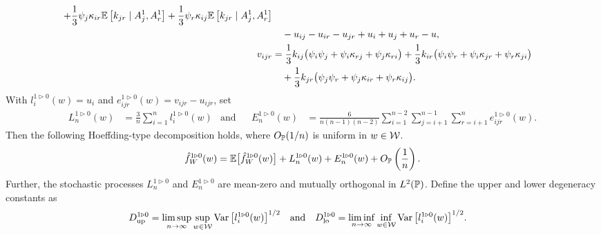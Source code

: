 \begin{lemma}
\begin{align*}
    + \frac{1}{3}
    \psi_j \kappa_{i r}
    \E\left[
      k_{jr}
    \mid A_j^1, A_r^1 \right]
    +
    \frac{1}{3}
    \psi_r \kappa_{i j}
    \E\left[
      k_{jr}
    \mid A_j^1, A_r^1 \right] \\
    &\quad-
    u_{i j} - u_{i r} - u_{jr}
    + u_i + u_j + u_r
    - u, \\
    v_{i j r}
    &=
    \frac{1}{3}
    k_{i j} \big(\psi_i \psi_j +\psi_i \kappa_{r j} +\psi_j \kappa_{r i} \big)
    + \frac{1}{3}
    k_{i r} \big(\psi_i \psi_r +\psi_i \kappa_{jr} +\psi_r \kappa_{j i} \big) \\
    &\quad+
    \frac{1}{3}
    k_{jr} \big(\psi_j \psi_r +\psi_j \kappa_{i r} +\psi_r \kappa_{i j} \big).
  \end{align*}
  With $l_i^{1 \triangleright 0}(w) = u_i$
  and $e_{i j r}^{1 \triangleright 0}(w) = v_{i j r} - u_{i j r}$,
  set
  \begin{align*}
    L_n^{1 \triangleright 0}(w)
    &=
    \frac{3}{n} \sum_{i=1}^n
    l_i^{1 \triangleright 0}(w)
    &\text{and}                 &
    &E_n^{1 \triangleright 0}(w)
    &=
    \frac{6}{n(n-1)(n-2)}
    \sum_{i=1}^{n-2}
    \sum_{j=i+1}^{n-1}
    \sum_{r=i+1}^n
    e_{i j r}^{1 \triangleright 0}(w).
  \end{align*}
  Then the following Hoeffding-type decomposition holds,
  where $O_\P(1/n)$ is uniform in $w \in \cW$.
  \begin{align*}
    \hat f_W^{1 \triangleright 0}(w)
    = \E\big[\hat f_W^{1 \triangleright 0}(w)\big]
    + L_n^{1 \triangleright 0}(w)
    + E_n^{1 \triangleright 0}(w)
    + O_\P\left( \frac{1}{n} \right).
  \end{align*}
  Further,
  the stochastic processes
  $L_n^{1 \triangleright 0}$
  and $E_n^{1 \triangleright 0}$
  are mean-zero
  and mutually orthogonal
  in $L^2(\P)$.
  Define the upper and lower degeneracy constants as
  \begin{align*}
    \Du^{1 \triangleright 0}
    &=
    \limsup_{n \to \infty}
    \sup_{w \in \cW}
    \Var\big[
      l_i^{1 \triangleright 0}(w)
    \big]^{1/2}
    &\text{and}&
    &
    \Dl^{1 \triangleright 0}
    &=
    \liminf_{n \to \infty}
    \inf_{w \in \cW}
    \Var\big[
      l_i^{1 \triangleright 0}(w)
    \big]^{1/2}.
  \end{align*}

\end{lemma}

